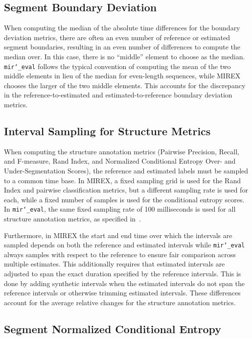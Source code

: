 \documentclass{article}
\def\mireval{\texttt{mir\char`_eval}}
\begin{document}
\subsection{Segment Boundary Deviation}

When computing the median of the absolute time differences for the boundary deviation metrics, there are often an even number of reference or estimated segment boundaries, resulting in an even number of differences to compute the median over.
In this case, there is no ``middle'' element to choose as the median.
\mireval{} follows the typical convention of computing the mean of the two middle elements in lieu of the median for even-length sequences, while MIREX chooses the larger of the two middle elements.
This accounts for the discrepancy in the reference-to-estimated and estimated-to-reference boundary deviation metrics.

\subsection{Interval Sampling for Structure Metrics}

When computing the structure annotation metrics (Pairwise Precision, Recall, and F-measure, Rand Index, and Normalized Conditional Entropy Over- and Under-Segmentation Scores), the reference and estimated labels must be sampled to a common time base.
In MIREX, a fixed sampling grid is used for the Rand Index and pairwise classification metrics, but a different sampling rate is used for each, while a fixed number of samples is used for the conditional entropy scores.
In \mireval{}, the same fixed sampling rate of 100 milliseconds is used for all
structure annotation metrics, as specified in~\cite{willis2013mirex}.

Furthermore, in MIREX the start and end time over which the intervals are sampled depends on both the reference and estimated intervals while \mireval{} always samples with respect to the reference to ensure fair comparison across multiple estimates.
This additionally requires that estimated intervals are adjusted to span the exact duration specified by the reference intervals.
This is done by adding synthetic intervals when the estimated intervals do not span the reference intervals or otherwise trimming estimated intervals.
These differences account for the average relative changes for the structure annotation metrics.

\subsection{Segment Normalized Conditional Entropy}
\end{document}
